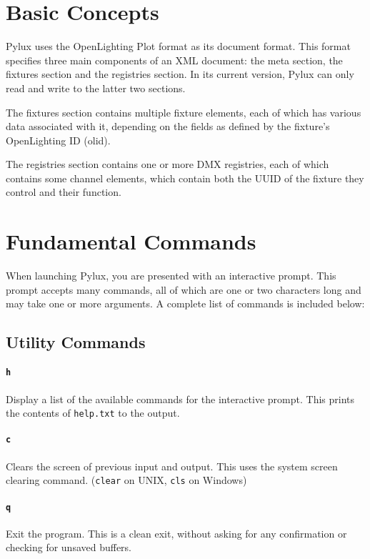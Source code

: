 \documentclass[a4paper]{article}
\begin{document}
\section{Basic Concepts}
Pylux uses the OpenLighting Plot format as its document format. This format 
specifies three main components of an XML document: the meta section, the 
fixtures section and the registries section. In its current version, Pylux 
can only read and write to the latter two sections.

The fixtures section contains multiple fixture elements, each of which has 
various data associated with it, depending on the fields as defined by the 
fixture's OpenLighting ID (olid).

The registries section contains one or more DMX registries, each of which 
contains some channel elements, which contain both the UUID of the fixture 
they control and their function.

\section{Fundamental Commands}
When launching Pylux, you are presented with an interactive prompt. This 
prompt accepts many commands, all of which are one or two characters long and 
may take one or more arguments. A complete list of commands is included below: 

\subsection{Utility Commands}

\paragraph{\texttt{h}}
Display a list of the available commands for the interactive prompt. This 
prints the contents of \texttt{help.txt}  to the output.

\paragraph{\texttt{c}}
Clears the screen of previous input and output. This uses the system screen 
clearing command. (\texttt{clear} on UNIX, \texttt{cls} on Windows)

\paragraph{\texttt{q}}
Exit the program. This is a clean exit, without asking for any confirmation or 
checking for unsaved buffers.
\end{document}
